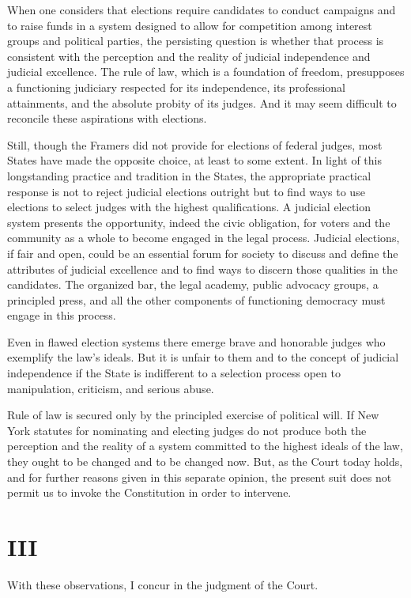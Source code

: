   When one considers that elections require candidates to conduct campaigns and to raise funds in a system designed to allow for competition among interest groups and political parties, the persisting question is whether that process is consistent with the perception and the reality of judicial independence and judicial excellence. The rule of law, which is a foundation of freedom, presupposes a functioning judiciary respected for its independence, its professional attainments, and the absolute probity of its judges. And it may seem difficult to reconcile these aspirations with elections.

  Still, though the Framers did not provide for elections of federal judges, most States have made the opposite choice, at least to some extent. In light of this longstanding practice and tradition in the States, the appropriate practical response is not to reject judicial elections outright but to find ways to use elections to select judges with the highest qualifications. A judicial election system presents the opportunity, indeed the civic obligation, for voters and the community as a whole to become engaged in the legal process. Judicial elections, if fair and open, could be an essential forum for society to discuss and define the attributes of judicial excellence and to find ways to discern those qualities in the candidates. The organized bar, the legal academy, public advocacy groups, a principled press, and all the other components of functioning democracy must engage in this process.

  Even in flawed election systems there emerge brave and honorable judges who exemplify the law's ideals. But it is unfair to them and to the concept of judicial independence if \newpage  the State is indifferent to a selection process open to manipulation, criticism, and serious abuse.

  Rule of law is secured only by the principled exercise of political will. If New York statutes for nominating and electing judges do not produce both the perception and the reality of a system committed to the highest ideals of the law, they ought to be changed and to be changed now. But, as the Court today holds, and for further reasons given in this separate opinion, the present suit does not permit us to invoke the Constitution in order to intervene.

\section{III}

  With these observations, I concur in the judgment of the Court.
